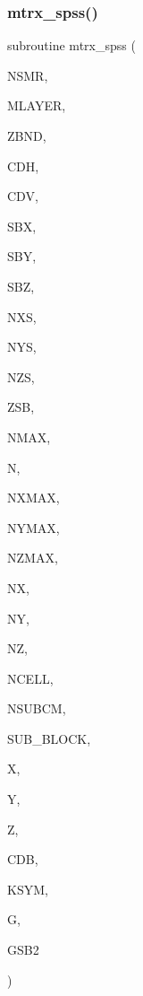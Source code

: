 \subsubsection{\texorpdfstring{mtrx\+\_\+spss()}{mtrx\_spss()}}
{\footnotesize\ttfamily subroutine mtrx\+\_\+spss (\begin{DoxyParamCaption}\item[{integer}]{N\+S\+MR,  }\item[{integer}]{M\+L\+A\+Y\+ER,  }\item[{real, dimension(0\+:mlayer)}]{Z\+B\+ND,  }\item[{complex, dimension(0\+:mlayer)}]{C\+DH,  }\item[{complex, dimension(0\+:mlayer)}]{C\+DV,  }\item[{real}]{S\+BX,  }\item[{real}]{S\+BY,  }\item[{real}]{S\+BZ,  }\item[{integer}]{N\+XS,  }\item[{integer}]{N\+YS,  }\item[{integer}]{N\+ZS,  }\item[{real}]{Z\+SB,  }\item[{integer}]{N\+M\+AX,  }\item[{integer}]{N,  }\item[{integer}]{N\+X\+M\+AX,  }\item[{integer}]{N\+Y\+M\+AX,  }\item[{integer}]{N\+Z\+M\+AX,  }\item[{integer, dimension(sub\+\_\+block)}]{NX,  }\item[{integer, dimension(sub\+\_\+block)}]{NY,  }\item[{integer, dimension(sub\+\_\+block)}]{NZ,  }\item[{integer, dimension(sub\+\_\+block)}]{N\+C\+E\+LL,  }\item[{integer}]{N\+S\+U\+B\+CM,  }\item[{integer}]{S\+U\+B\+\_\+\+B\+L\+O\+CK,  }\item[{real, dimension(nxmax,sub\+\_\+block)}]{X,  }\item[{real, dimension(nymax,sub\+\_\+block)}]{Y,  }\item[{real, dimension(nzmax,sub\+\_\+block)}]{Z,  }\item[{complex, dimension(nsubcm,sub\+\_\+block)}]{C\+DB,  }\item[{integer}]{K\+S\+YM,  }\item[{complex, dimension(nmax,n)}]{G,  }\item[{complex, dimension(nsmr/3,3)}]{G\+S\+B2 }\end{DoxyParamCaption})}

